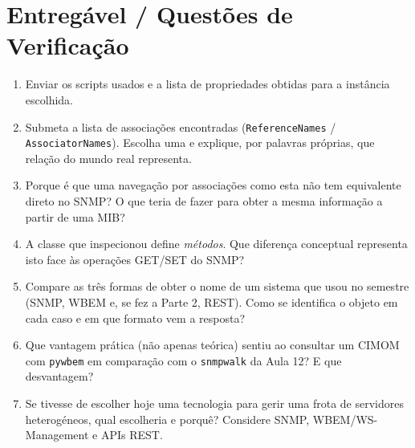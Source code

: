 \documentclass[11pt,a4paper]{article}
\begin{document}
\section{Entregável / Questões de Verificação}
\begin{enumerate}[label=\alph*)]
  \setlength\itemsep{0.2cm}
  \item Enviar os scripts usados e a lista de propriedades obtidas para a instância escolhida.
  \item Submeta a lista de associações encontradas (\texttt{ReferenceNames} / \texttt{AssociatorNames}). Escolha uma e explique, por palavras próprias, que relação do mundo real representa.
  \item Porque é que uma navegação por associações como esta não tem equivalente direto no SNMP? O que teria de fazer para obter a mesma informação a partir de uma MIB?
  \item A classe que inspecionou define \emph{métodos}. Que diferença conceptual representa isto face às operações GET/SET do SNMP?
  \item Compare as três formas de obter o nome de um sistema que usou no semestre (SNMP, WBEM e, se fez a Parte 2, REST). Como se identifica o objeto em cada caso e em que formato vem a resposta?
  \item Que vantagem prática (não apenas teórica) sentiu ao consultar um CIMOM com \texttt{pywbem} em comparação com o \texttt{snmpwalk} da Aula 12? E que desvantagem?
  \item Se tivesse de escolher hoje uma tecnologia para gerir uma frota de servidores heterogéneos, qual escolheria e porquê? Considere SNMP, WBEM/WS-Management e APIs REST.
\end{enumerate}
\end{document}
